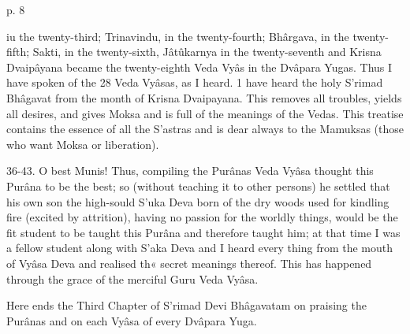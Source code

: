  

p. 8

 

iu the twenty-third; Trinavindu, in the twenty-fourth; Bhârgava, in the twenty-fifth; Sakti, in the twenty-sixth, Jâtûkarnya in the twenty-seventh and Krisna Dvaipâyana became the twenty-eighth Veda Vyâs in the Dvâpara Yugas. Thus I have spoken of the 28 Veda Vyâsas, as I heard. 1 have heard the holy S’rimad Bhâgavat from the month of Krisna Dvaipayana. This removes all troubles, yields all desires, and gives Moksa and is full of the meanings of the Vedas. This treatise contains the essence of all the S’astras and is dear always to the Mamuksas (those who want Moksa or liberation).

 

36-43. O best Munis! Thus, compiling the Purânas Veda Vyâsa thought this Purâna to be the best; so (without teaching it to other persons) he settled that his own son the high-sould S’uka Deva born of the dry woods used for kindling fire (excited by attrition), having no passion for the worldly things, would be the fit student to be taught this Purâna and therefore taught him; at that time I was a fellow student along with S’aka Deva and I heard every thing from the mouth of Vyâsa Deva and realised th« secret meanings thereof. This has happened through the grace of the merciful Guru Veda Vyâsa.

 

Here ends the Third Chapter of S’rimad Devi Bhâgavatam on praising the Purânas and on each Vyâsa of every Dvâpara Yuga.
